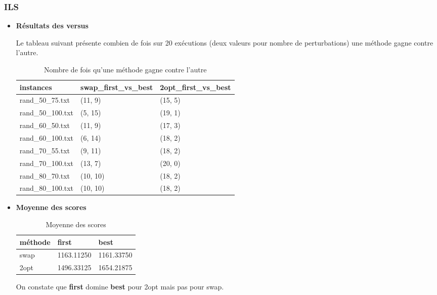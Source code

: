 \subsubsection{ILS}
\begin{itemize}
	\item \textbf{Résultats des versus}
	
	Le tableau suivant présente combien de fois sur 20 exécutions (deux valeurs pour nombre de perturbations) une méthode gagne contre l'autre. 
	
	\begin{table}[ht]
		\centering
		\caption{Nombre de fois qu'une méthode gagne contre l'autre}
		\begin{tabular}[t]
			{m{0.2\textwidth}m{}m{}}
			\toprule
			instances &	swap\_first\_vs\_best &	2opt\_first\_vs\_best \\
			
			\midrule
			rand\_50\_75.txt&	(11, 9)	&(15, 5)\\
			rand\_50\_100.txt&	(5, 15)&	(19, 1)\\
			rand\_60\_50.txt&	(11, 9)&	(17, 3)\\
			rand\_60\_100.txt&	(6, 14)&	(18, 2)\\
			rand\_70\_55.txt&	(9, 11)&	(18, 2)\\
			rand\_70\_100.txt&	(13, 7)	&(20, 0)\\
			rand\_80\_70.txt&	(10, 10)	&	(18, 2)\\
			rand\_80\_100.txt&	(10, 10)	&	(18, 2)\\
			
		
			\bottomrule
		\end{tabular}
	\end{table}
\item \textbf{Moyenne des scores}

\begin{table}[ht]
	\rowcolors{2}{gray!10}{white}
	\centering
	\caption{Moyenne des scores}
	\begin{tabular}[t]
		{m{}m{}m{}}
		\toprule
		méthode &		first&		best\\
		\midrule
		swap&		1163.11250&	1161.33750\\
		2opt&		1496.33125& 1654.21875 \\
		
		\bottomrule
	\end{tabular}
\end{table}
On constate que \textbf{first} domine \textbf{best} pour 2opt mais pas pour swap.
\end{itemize}


